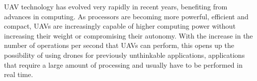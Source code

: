 


\gls{UAV} technology has evolved very rapidly in recent years, benefiting from advances in computing. As processors are becoming more powerful, efficient and compact, \glspl{UAV} are increasingly capable of higher computing power without increasing their weight or compromising their autonomy. With the increase in the number of operations per second that \glspl{UAV} can perform, this opens up the possibility of using drones for previously unthinkable applications, applications that require a large amount of processing and usually have to be performed in real time.



